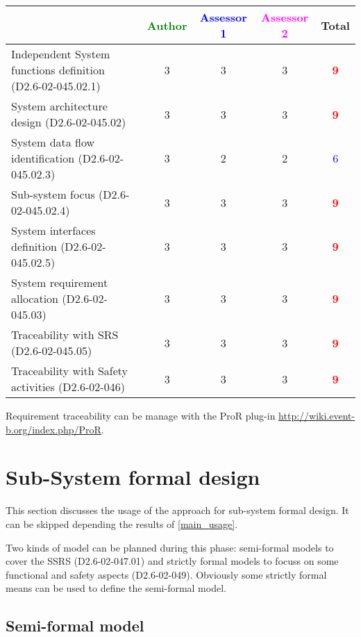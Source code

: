 \begin{tabular}{|l | c | c | c | c|}
\hline
& \textcolor{green}{Author} & \textcolor{blue}{Assessor 1} & \textcolor{magenta}{Assessor 2} & Total \\
\hline
Independent System functions definition (D2.6-02-045.02.1)  & 3     & 3     & 3     & \textcolor{red}{\textbf{9}} \\
\hline 
System architecture design (D2.6-02-045.02) & 3     & 3     & 3     & \textcolor{red}{\textbf{9}} \\
\hline
System data flow identification (D2.6-02-045.02.3)  & 3     & 2     & 2     &  \textcolor{blue}{6}  \\
\hline
Sub-system focus (D2.6-02-045.02.4)  & 3     & 3     & 3     & \textcolor{red}{\textbf{9}} \\
\hline
System interfaces definition (D2.6-02-045.02.5)  & 3     & 3     & 3     & \textcolor{red}{\textbf{9}}  \\
\hline
System requirement allocation (D2.6-02-045.03)  & 3     & 3     & 3     & \textcolor{red}{\textbf{9}} \\
\hline
Traceability with SRS (D2.6-02-045.05)  & 3     & 3     & 3     & \textcolor{red}{\textbf{9}} \\
\hline
Traceability with Safety activities (D2.6-02-046)  & 3     & 3     & 3     & \textcolor{red}{\textbf{9}} \\
\hline
\end{tabular}

\begin{author_comment}
Requirement traceability can be manage with the ProR plug-in \url{http://wiki.event-b.org/index.php/ProR}.
\end{author_comment}

\section{Sub-System formal design}
This section discusses the usage of the approach for sub-system formal design.
It can be skipped depending the results of \ref{main_usage}.

Two kinds of model can be planned during this phase: semi-formal models to  cover the SSRS (D2.6-02-047.01) and strictly formal  models to  focuss on some functional and safety aspects (D2.6-02-049).  Obviously some strictly  formal means can be used to define the semi-formal  model.

\subsection{Semi-formal model}


